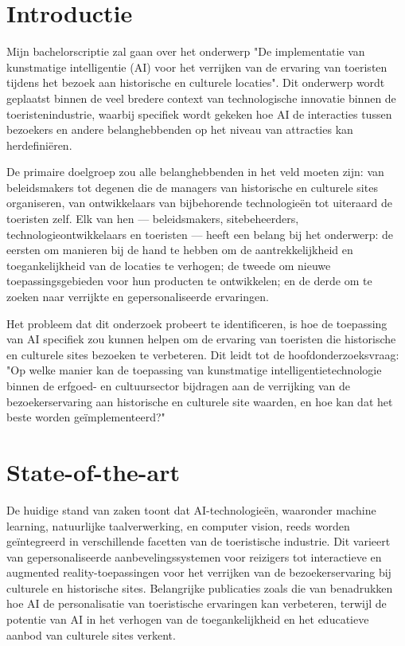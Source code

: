 
\section{Introductie}%
\label{sec:introductie}

Mijn bachelorscriptie zal gaan over het onderwerp "De implementatie van kunstmatige intelligentie (AI) voor het verrijken van de ervaring van toeristen tijdens het bezoek aan historische en culturele locaties". Dit onderwerp wordt geplaatst binnen de veel bredere context van technologische innovatie binnen de toeristenindustrie, waarbij specifiek wordt gekeken hoe AI de interacties tussen bezoekers en andere belanghebbenden op het niveau van attracties kan herdefiniëren.

De primaire doelgroep zou alle belanghebbenden in het veld moeten zijn: van beleidsmakers tot degenen die de managers van historische en culturele sites organiseren, van ontwikkelaars van bijbehorende technologieën tot uiteraard de toeristen zelf. Elk van hen — beleidsmakers, sitebeheerders, technologieontwikkelaars en toeristen — heeft een belang bij het onderwerp: de eersten om manieren bij de hand te hebben om de aantrekkelijkheid en toegankelijkheid van de locaties te verhogen; de tweede om nieuwe toepassingsgebieden voor hun producten te ontwikkelen; en de derde om te zoeken naar verrijkte en gepersonaliseerde ervaringen.

Het probleem dat dit onderzoek probeert te identificeren, is hoe de toepassing van AI specifiek zou kunnen helpen om de ervaring van toeristen die historische en culturele sites bezoeken te verbeteren. Dit leidt tot de hoofdonderzoeksvraag: "Op welke manier kan de toepassing van kunstmatige intelligentietechnologie binnen de erfgoed- en cultuursector bijdragen aan de verrijking van de bezoekerservaring aan historische en culturele site waarden, en hoe kan dat het beste worden geïmplementeerd?"


\section{State-of-the-art}%
\label{sec:state-of-the-art}


De huidige stand van zaken toont dat AI-technologieën, waaronder machine learning, natuurlijke taalverwerking, en computer vision, reeds worden geïntegreerd in verschillende facetten van de toeristische industrie. Dit varieert van gepersonaliseerde aanbevelingssystemen voor reizigers tot interactieve en augmented reality-toepassingen voor het verrijken van de bezoekerservaring bij culturele en historische sites. Belangrijke publicaties zoals die van \autocite{Zhou2018} benadrukken hoe AI de personalisatie van toeristische ervaringen kan verbeteren, terwijl \autocite{Umerov2023InnovativeDO} de potentie van AI in het verhogen van de toegankelijkheid en het educatieve aanbod van culturele sites verkent.

